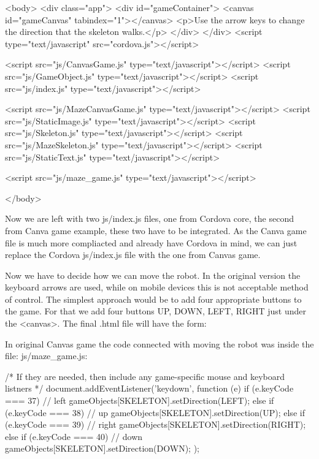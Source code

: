 \begin{html}
<body>
    <div class="app">
        <div id="gameContainer">
           <canvas id="gameCanvas" tabindex="1"></canvas>
           <p>Use the arrow keys to change the direction that the skeleton walks.</p>
        </div>
    </div>
    <script type="text/javascript" src="cordova.js"></script>

    <script src="js/CanvasGame.js" type="text/javascript"></script>
    <script src="js/GameObject.js" type="text/javascript"></script>
    <script src="js/index.js" type="text/javascript"></script>

    <script src="js/MazeCanvasGame.js" type="text/javascript"></script>
    <script src="js/StaticImage.js" type="text/javascript"></script>
    <script src="js/Skeleton.js" type="text/javascript"></script>
    <script src="js/MazeSkeleton.js" type="text/javascript"></script>
    <script src="js/StaticText.js" type="text/javascript"></script>


    <script src="js/maze_game.js" type="text/javascript"></script>

</body>
\end{html}
Now we are left with two js/index.js files, one from Cordova core, the second from Canva game example, these two have to be integrated. As the Canva game file is much more compliacted and already have Cordova in mind, we can just replace the Cordova js/index.js file with the one from Canvas game. 

Now we have to decide how we can move the robot. In the original version the keyboard arrows are used, while on mobile devices this is not acceptable method of control. The simplest approach would be to add four appropriate buttons to the game. For that we add four buttons UP, DOWN, LEFT, RIGHT just under the <canvas>. The final .html file will have the form:


In original Canvas game the code connected with moving the robot was inside the file: js/maze\_game.js:
\begin{js}
/* If they are needed, then include any game-specific mouse and keyboard listners */
    document.addEventListener('keydown', function (e)
    {
        if (e.keyCode === 37)  // left
        {
            gameObjects[SKELETON].setDirection(LEFT);
        }
        else if (e.keyCode === 38) // up
        {
            gameObjects[SKELETON].setDirection(UP);
        }
        else if (e.keyCode === 39) // right
        {
            gameObjects[SKELETON].setDirection(RIGHT);
        }
        else if (e.keyCode === 40) // down
        {
            gameObjects[SKELETON].setDirection(DOWN);
        }
    });
\end{js}


